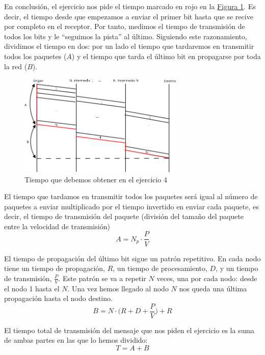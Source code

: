 \documentclass[10pt,a4paper,spanish]{report}
\begin{document}
En conclusión, el ejercicio nos pide el tiempo marcado en rojo en la \hyperref[ejercicio4-2]{Figura \ref*{ejercicio4-2}}. Es decir, el tiempo desde que empezamos a enviar el primer bit hasta que se recive por completo en el receptor. Por tanto, medimos el tiempo de transmisión de todos los bits y le ``seguimos la pista'' al último. Siguiendo este razonamiento, dividimos el tiempo en dos: por un lado el tiempo que tardaremos en transmitir todos los paquetes ($A$) y el tiempo que tarda el último bit en propagarse por toda la red ($B$).

\begin{figure}[!h]
  \centering
  \includegraphics[width=0.7\textwidth]{diagramaejer4-2}
  \caption{Tiempo que debemos obtener en el ejercicio 4}
  \label{ejercicio4-2}
\end{figure}

El tiempo que tardamos en transmitir todos los paquetes será igual al número de paquetes a enviar multiplicado por el tiempo invertido en enviar cada paquete, es decir, el tiempo de transmisión del paquete (división del tamaño del paquete entre la velocidad de transmisión)
\begin{displaymath}
  A = N_p \cdot \frac{P}{V}
\end{displaymath}

El tiempo de propagación del último bit sigue un patrón repetitivo. En cada nodo tiene un tiempo de propagación, $R$, un tiempo de procesamiento, $D$, y un tiempo de transmisión, $\frac{P}{V}$. Este patrón se va a repetir $N$ veces, una por cada nodo: desde el nodo 1 hasta el $N$. Una vez hemos llegado al nodo $N$ nos queda una última propagación hasta el nodo destino.
\begin{displaymath}
  B = N \cdot \Big( R + D + \frac{P}{V} \Big) + R
\end{displaymath}

El tiempo total de transmisión del mensaje que nos piden el ejercicio es la suma de ambas partes en las que lo hemos dividido:
\begin{displaymath}
  T = A + B
\end{displaymath}
\end{document}
